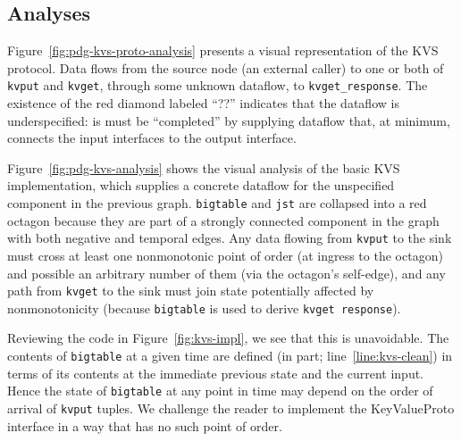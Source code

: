 \subsection{Analyses}


Figure~\ref{fig:pdg-kvs-proto-analysis} presents a visual representation of the KVS protocol.  Data
flows from the source node (an external caller) to one or both of \texttt{kvput} and 
\texttt{kvget}, through some unknown dataflow, to \texttt{kvget\_response}.
The existence of the red diamond labeled ``??'' indicates that the dataflow is underspecified:
is must be ``completed'' by supplying dataflow that, at minimum, connects the input 
interfaces to the output interface.

Figure~\ref{fig:pdg-kvs-analysis} shows the visual analysis of the basic KVS implementation,
which supplies a concrete dataflow for the unspecified component in the previous
graph.  \texttt{bigtable} and \texttt{jst} are collapsed into a red octagon because they
are part of a strongly connected component in the graph with both negative and temporal 
edges.  Any data flowing from \texttt{kvput} to the sink must cross at least one nonmonotonic
point of
order (at ingress to the octagon) and possible an arbitrary number of them (via the
octagon's self-edge), and any path from \texttt{kvget} to the sink must join state potentially
affected by nonmonotonicity (because \texttt{bigtable} is used to derive \texttt{kvget response}).

Reviewing the code in Figure~\ref{fig:kvs-impl}, we see that this is unavoidable.  The 
contents of \texttt{bigtable} at a given time are defined (in part; line~\ref{line:kvs-clean}) in terms
of its contents at the immediate previous state and the current input.  Hence the state
of \texttt{bigtable} at any point in time may depend on the order of arrival of \texttt{kvput} 
tuples.  We challenge the reader to implement the KeyValueProto interface in a way that
has no such point of order.





